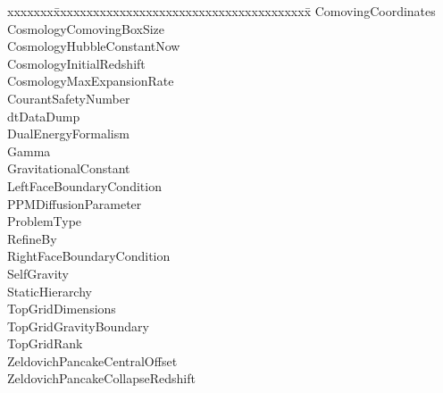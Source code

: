 \documentclass{book}
\begin{document}
{\parametersize
\begin{tabbing}
xxxxxxx\=xxxxxxxxxxxxxxxxxxxxxxxxxxxxxxxxxxxxxxx\=\kill
\> ComovingCoordinates                \\
\> CosmologyComovingBoxSize        \\
\> CosmologyHubbleConstantNow  \\
\> CosmologyInitialRedshift          \\
\> CosmologyMaxExpansionRate       \\
\> CourantSafetyNumber     \\
\> dtDataDump                  \\
\> DualEnergyFormalism            \\
\> Gamma                   \\
\> GravitationalConstant              \\
\> LeftFaceBoundaryCondition          \\
\> PPMDiffusionParameter          \\
\> ProblemType                       \\
\> RefineBy                   \\
\> RightFaceBoundaryCondition  \\
\> SelfGravity                        \\
\> StaticHierarchy                \\
\> TopGridDimensions           \\
\> TopGridGravityBoundary             \\
\> TopGridRank                 \\
\> ZeldovichPancakeCentralOffset     \\
\> ZeldovichPancakeCollapseRedshift 
\end{tabbing}}

\appendix
\end{document}
